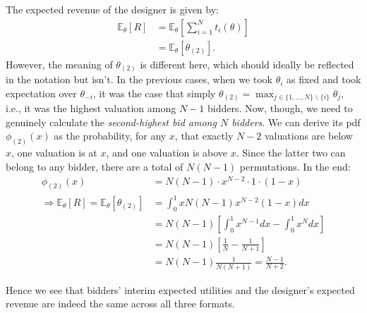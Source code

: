 \documentclass[a4paper]{article}
\begin{document}
The expected revenue of the designer is given by:
\begin{align*}
	\mathbb{E}_\theta [R]
	&= \mathbb{E}_\theta \left[ \sum_{i=1}^N t_i(\theta) \right]
	\\
	&= \mathbb{E}_\theta \left[ \theta_{(2)} \right].
\end{align*}
However, the meaning of $\theta_{(2)}$ is different here, which should ideally be reflected in the notation but isn't. In the previous cases, when we took $\theta_i$ as fixed and took expectation over $\theta_{-i}$, it was the case that simply $\theta_{(2)} = \max_{j \in \{1,...,N\} \backslash \{i\}} \theta_j$, i.e., it was the highest valuation among $N-1$ bidders. Now, though, we need to genuinely calculate the \emph{second-highest bid among $N$ bidders}. We can derive its pdf $\phi_{(2)}(x)$ as the probability, for any $x$, that exactly $N-2$ valuations are below $x$, one valuation is at $x$, and one valuation is above $x$. Since the latter two can belong to any bidder, there are a total of $N(N-1)$ permutations. In the end:
\begin{align*}
	\phi_{(2)}(x) &= N (N-1) \cdot x^{N-2} \cdot 1 \cdot (1-x)
	\\ \Rightarrow 
	\mathbb{E}_\theta [R] = \mathbb{E}_\theta \left[ \theta_{(2)} \right]
	&= \int_0^1 x N(N-1) x^{N-2} (1-x) dx
	\\
	&= N(N-1) \left[ \int_0^1 x^{N-1} dx - \int_0^1 x^N dx \right]
	\\
	&= N(N-1) \left[\frac{1}{N} - \frac{1}{N+1}\right]
	\\
	&= N(N-1) \frac{1}{N(N+1)} = \frac{N-1}{N+2}.
\end{align*}

Hence we see that bidders' interim expected utilities and the designer's expected revenue are indeed the same across all three formats.
\fi 



\end{document}
